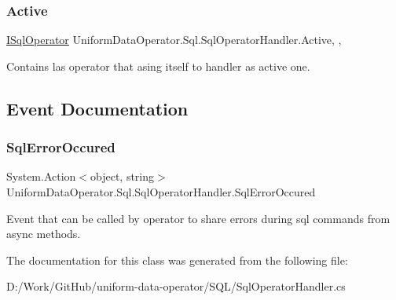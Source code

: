 \subsubsection{\texorpdfstring{Active}{Active}}
{\footnotesize\ttfamily \mbox{\hyperlink{interface_uniform_data_operator_1_1_sql_1_1_i_sql_operator}{I\+Sql\+Operator}} Uniform\+Data\+Operator.\+Sql.\+Sql\+Operator\+Handler.\+Active\hspace{0.3cm}{\ttfamily [static]}, {\ttfamily [get]}, {\ttfamily [set]}}



Contains las operator that asing itself to handler as active one. 



\subsection{Event Documentation}
\mbox{\label{class_uniform_data_operator_1_1_sql_1_1_sql_operator_handler_ab6cf915e80cf89b3e6eb14bf48a19185}} 
\subsubsection{\texorpdfstring{Sql\+Error\+Occured}{SqlErrorOccured}}
{\footnotesize\ttfamily System.\+Action$<$object, string$>$ Uniform\+Data\+Operator.\+Sql.\+Sql\+Operator\+Handler.\+Sql\+Error\+Occured\hspace{0.3cm}{\ttfamily [static]}}



Event that can be called by operator to share errors during sql commands from async methods. 



The documentation for this class was generated from the following file\+:\begin{DoxyCompactItemize}
\item 
D\+:/\+Work/\+Git\+Hub/uniform-\/data-\/operator/\+S\+Q\+L/Sql\+Operator\+Handler.\+cs\end{DoxyCompactItemize}

